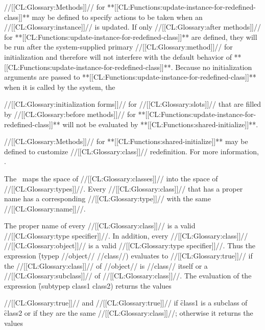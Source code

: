 \endsubsubsection%


//[[CL:Glossary:Methods]]// for **[[CL:Functions:update-instance-for-redefined-class]]** may be  defined to specify actions to be taken when an //[[CL:Glossary:instance]]// is updated. If only //[[CL:Glossary:after methods]]// for **[[CL:Functions:update-instance-for-redefined-class]]** are defined, they will be run after the system-supplied primary //[[CL:Glossary:method]]// for initialization and therefore will not interfere with the default behavior of **[[CL:Functions:update-instance-for-redefined-class]]**.  Because no initialization arguments are passed to **[[CL:Functions:update-instance-for-redefined-class]]** when it is called by the system, the 

//[[CL:Glossary:initialization forms]]// for //[[CL:Glossary:slots]]//  that are filled by //[[CL:Glossary:before methods]]// for **[[CL:Functions:update-instance-for-redefined-class]]**  will not be evaluated by **[[CL:Functions:shared-initialize]]**.

//[[CL:Glossary:Methods]]// for **[[CL:Functions:shared-initialize]]** may be defined to customize //[[CL:Glossary:class]]// redefinition.  For more information, \seesection\SharedInitialize.

\endsubsubsection%

  
                                               The \CLOS\ maps the space of //[[CL:Glossary:classes]]// into the space of //[[CL:Glossary:types]]//. Every //[[CL:Glossary:class]]// that has a proper name has a corresponding //[[CL:Glossary:type]]//  with the same //[[CL:Glossary:name]]//.  

The proper name of every //[[CL:Glossary:class]]// is a valid //[[CL:Glossary:type specifier]]//.  In addition, every //[[CL:Glossary:class]]// //[[CL:Glossary:object]]// is a valid //[[CL:Glossary:type specifier]]//.   Thus the expression \f{(typep //object// //class//)} evaluates to  //[[CL:Glossary:true]]// if the //[[CL:Glossary:class]]// of //object// is //class// itself or  a //[[CL:Glossary:subclass]]// of //[[CL:Glossary:class]]//.  The evaluation of the expression \f{(subtypep class1 class2)} returns the values 

//[[CL:Glossary:true]]// and //[[CL:Glossary:true]]// if \f{class1} is a subclass of \f{class2} or if they are the same //[[CL:Glossary:class]]//; otherwise it returns the values 

